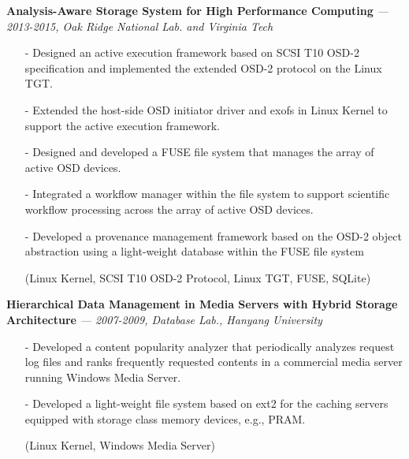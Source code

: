   {\bf Analysis-Aware Storage System for High Performance Computing}
    {\it \footnotesize --- 2013-2015, Oak Ridge National Lab. and Virginia Tech}
    \begin{itemize}[leftmargin=*]
    \setlength\itemsep{-0.02in}
    \item[-] Designed an active execution framework based on SCSI T10 OSD-2 specification
             and implemented the extended OSD-2 protocol on the Linux TGT.
    \item[-] Extended the host-side OSD initiator driver and exofs in Linux Kernel
             to support the active execution framework.
    \item[-] Designed and developed a FUSE file system that manages
             the array of active OSD devices.
    \item[-] Integrated a workflow manager within the file system to support scientific
             workflow processing across the array of active OSD devices.
    \item[-] Developed a provenance management framework based on the OSD-2 object abstraction
             using a light-weight database within the FUSE file system
    \item[] {\small(Linux Kernel, SCSI T10 OSD-2 Protocol, Linux TGT, FUSE, SQLite)}
    \end{itemize}
  \vspace{-0.15in}
  {\bf Hierarchical Data Management in Media Servers with Hybrid Storage Architecture}
    {\it \footnotesize --- 2007-2009, Database Lab., Hanyang University}
    \begin{itemize}[leftmargin=*]
    \setlength\itemsep{-0.02in}
    \item[-] Developed a content popularity analyzer that periodically analyzes 
             request log files and ranks frequently requested contents
             in a commercial media server running Windows Media Server.
    \item[-] Developed a light-weight file system based on ext2
             for the caching servers equipped with 
             storage class memory devices, e.g., PRAM.
    \item[] {\small(Linux Kernel, Windows Media Server)}
    \end{itemize}
  \vspace{-0.15in}
